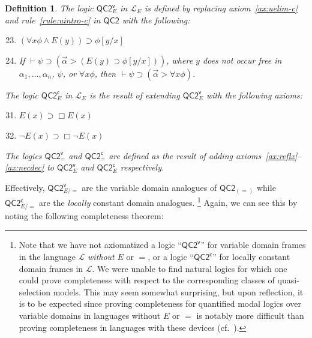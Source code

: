\documentclass[12pt]{article}
\newtheorem{definition}{Definition}
\newcommand{\would}{\mathbin{>}}
\newcommand{\nec}{\mathop{\Box}}
\newcommand{\then}{\mathbin{\supset}}
\begin{document}
\begin{definition}
\label{def:QC2-v}
    The logic $\mathsf{QC2^v_{\textit{E}}}$ in $\mathcal{L}_E$ is defined by replacing axiom~\ref{ax:uelim-c} and rule~\ref{rule:uintro-c} in $\mathsf{QC2}$ with the following:
    \begin{enumerate}[label={\arabic*$^{\mathsf{v}}$.},itemsep=1mm]
    \setcounter{enumi}{22}
        \item $(\forall x\phi \wedge E(y)) \then \phi[y/x]$\label{ax:uelim-v}
    \setcounter{enumi}{26}
        \item If $\vdash \psi \then (\vec{\alpha} \would (E(y) \supset \phi[y/x]))$, where $y$ does not occur free in $\alpha_1,\dots,\alpha_n$, $\psi$, or $\forall x\phi$, then $\vdash \psi \then (\vec{\alpha} \would \forall x\phi)$.\label{rule:uintro-v}
    \end{enumerate}
    The logic $\mathsf{QC2^c_{\textit{E}}}$ in $\mathcal{L}_E$ is the result of extending $\mathsf{QC2^v_{\textit{E}}}$ with the following axioms:
    \begin{enumerate}[label={\arabic*$^{\mathsf{c}}$.}]
    \setcounter{enumi}{30}
        \item $E(x) \then \nec{E(x)}$\label{ax:nondec}
        \item $\neg E(x) \then \nec\neg E(x)$\label{ax:noninc}
    \end{enumerate}
    The logics $\mathsf{QC2^v_=}$ and  $\mathsf{QC2^c_=}$ are defined as the result of adding axioms~\ref{ax:reflx}--\ref{ax:necdec} to $\mathsf{QC2^v_{\textit{E}}}$ and $\mathsf{QC2^c_{\textit{E}}}$ respectively. 
\end{definition}

Effectively, $\mathsf{QC2^v_{\textit{E}/=}}$ are the variable domain analogues of $\mathsf{QC2_{(=)}}$ while $\mathsf{QC2^c_{\textit{E}/=}}$ are the \emph{locally} constant domain analogues.%
\footnote{
    Note that we have not axiomatized a logic ``$\mathsf{QC2^v}$'' for variable domain frames in the language $\mathcal{L}$ \emph{without} $E$ or $=$, or a logic ``$\mathsf{QC2^c}$'' for locally constant domain frames in $\mathcal{L}$. 
    We were unable to find natural logics for which one could prove completeness with respect to the corresponding classes of quasi-selection models. 
    This may seem somewhat surprising, but upon reflection, it is to be expected since proving completeness for quantified modal logics over variable domains in languages without $E$ or $=$ is notably more difficult than proving completeness in languages with these devices (cf.~\cite[pp.\ 304ff.]{HughesCresswell1996}). 
    } %
Again, we can see this by noting the following completeness theorem:
\end{document}
